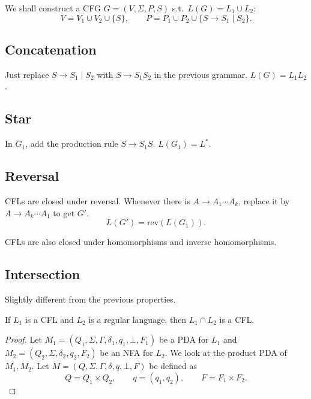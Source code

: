 We shall construct a CFG $G = (V, \Sigma, P, S)$ s.t.\ $L(G) = L_1 \cup L_2$:
\[
V = V_1 \cup V_2 \cup \{S\}, \qquad P = P_1 \cup P_2 \cup \{S \to S_1 \mid S_2\}.
\]

\subsection*{Concatenation}

Just replace $S \to S_1 \mid S_2$ with $S \to S_1S_2$ in the previous grammar. $L(G) = L_1L_2$.

\subsection*{Star}

In $G_1$, add the production rule $S \to S_1S$. $L(G_1) = L^*$.

\subsection*{Reversal}

CFLs are closed under reversal. Whenever there is $A \to A_1 \cdots A_k$, replace it by $A \to A_k \cdots A_1$ to get $G'$.
\[
L(G') = \mathrm{rev}(L(G_1)).
\]

CFLs are also closed under homomorphisms and inverse homomorphisms.

\subsection*{Intersection}

Slightly different from the previous properties.

\begin{blackbox}
\begin{proposition}
If $L_1$ is a CFL and $L_2$ is a regular language, then $L_1 \cap L_2$ is a CFL.
\end{proposition}
\end{blackbox}

\begin{proof}
Let $M_1 = (Q_1, \Sigma, \Gamma, \delta_1, q_1, \bot, F_1)$ be a PDA for $L_1$ and $M_2 = (Q_2, \Sigma, \delta_2, q_2, F_2)$ be an NFA for $L_2$. We look at the product PDA of $M_1, M_2$. Let $M = (Q, \Sigma, \Gamma, \delta, q, \bot, F)$ be defined as
\[
Q = Q_1 \times Q_2, \qquad q = (q_1, q_2), \qquad F = F_1 \times F_2.
\]
\end{proof}